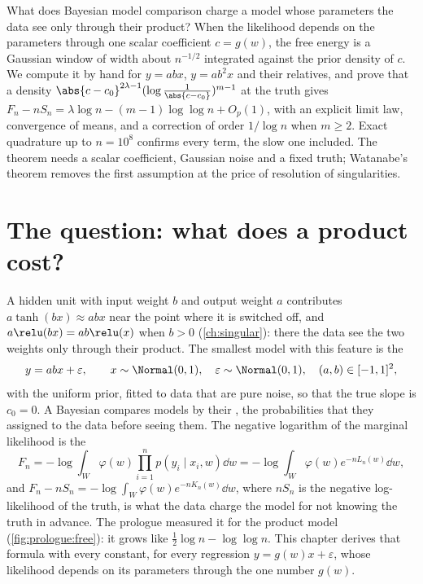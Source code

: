 \begin{refsection}

\begin{chaptersummary}
What does Bayesian model comparison charge a model whose parameters the data see only through their product? When the likelihood depends on the parameters through one scalar coefficient $c=g(w)$, the free energy is a Gaussian window of width about $n^{-1/2}$ integrated against the prior density of $c$. We compute it by hand for $y=abx$, $y=ab^2x$ and their relatives, and prove that a density $\abs{c-c_0}^{2\lambda-1}(\log\frac1{\abs{c-c_0}})^{m-1}$ at the truth gives $F_n-nS_n=\lambda\log n-(m-1)\log\log n+O_p(1)$, with an explicit limit law, convergence of means, and a correction of order $1/\log n$ when $m\ge2$. Exact quadrature up to $n=10^8$ confirms every term, the slow one included. The theorem needs a scalar coefficient, Gaussian noise and a fixed truth; Watanabe's theorem removes the first assumption at the price of resolution of singularities.
\end{chaptersummary}

\section{The question: what does a product cost?}\label{sec:coefficient:question}

A hidden unit with input weight $b$ and output weight $a$ contributes $a\tanh(bx)\approx abx$ near the point where it is switched off, and $a\relu(bx)=ab\relu(x)$ when $b>0$ (\cref{ch:singular}): there the data see the two weights only through their product. The smallest model with this feature is the 
\[
y=abx+\varepsilon,\qquad x\sim\Normal(0,1),\quad\varepsilon\sim\Normal(0,1),\quad(a,b)\in[-1,1]^2,
\]
with the uniform prior, fitted to data that are pure noise, so that the true slope is $c_0=0$. A Bayesian compares models by their , the probabilities that they assigned to the data before seeing them. The negative logarithm of the marginal likelihood is the 
\[
F_n=-\log\int_W\varphi(w)\prod_{i=1}^np(y_i\mid x_i,w)\dd w=-\log\int_W\varphi(w)e^{-nL_n(w)}\dd w,
\]
and $F_n-nS_n=-\log\int_W\varphi(w)e^{-nK_n(w)}\dd w$, where $nS_n$ is the negative log-likelihood of the truth, is what the data charge the model for not knowing the truth in advance. The prologue measured it for the product model (\cref{fig:prologue:free}): it grows like $\tfrac12\log n-\log\log n$. This chapter derives that formula with every constant, for every regression $y=g(w)x+\varepsilon$, whose likelihood depends on its parameters through the one number $g(w)$.


\end{refsection}
